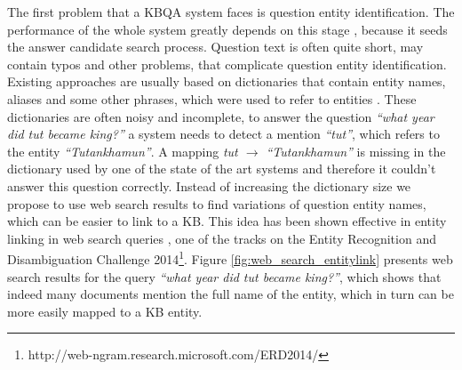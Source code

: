 The first problem that a KBQA system faces is question entity identification.
The performance of the whole system greatly depends on this stage \cite{yao-scratch-qa-naacl2015}, because it seeds the answer candidate search process.
Question text is often quite short, may contain typos and other problems, that complicate question entity identification.
Existing approaches are usually based on dictionaries that contain entity names, aliases and some other phrases, which were used to refer to entities \cite{SPITKOVSKY12.266}.
These dictionaries are often noisy and incomplete, \eg to answer the question \textit{``what year did tut became king?''} a system needs to detect a mention \textit{``tut''}, which refers to the entity \textit{``Tutankhamun''}.
A mapping \textit{tut $\rightarrow$ ``Tutankhamun''} is missing in the dictionary used by one of the state of the art systems and therefore it couldn't answer this question correctly.
Instead of increasing the dictionary size we propose to use web search results to find variations of question entity names, which can be easier to link to a KB.
This idea has been shown effective in entity linking in web search queries \cite{SMAPH_ERD:2014}, one of the tracks on the Entity Recognition and Disambiguation Challenge 2014\footnote{http://web-ngram.research.microsoft.com/ERD2014/}.
Figure \ref{fig:web_search_entitylink} presents web search results for the query \textit{``what year did tut became king?''}, which shows that indeed many documents mention the full name of the entity, which in turn can be more easily mapped to a KB entity.

